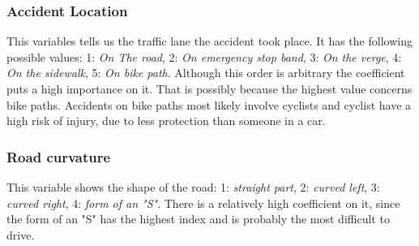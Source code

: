 \documentclass{article}
\begin{document}
\subsubsection{Accident Location}

This variables tells us the traffic lane the accident took place. It has the following possible values: 1: \textit{On The road}, 2: \textit{On emergency stop band}, 3: \textit{On the verge}, 4: \textit{On the sidewalk}, 5: \textit{On bike path}. Although this order is arbitrary the coefficient puts a high importance on it. That is possibly because the highest value concerns bike paths. Accidents on bike paths most likely involve cyclists and cyclist have a high risk of injury, due to less protection than someone in a car.





\subsubsection{Road curvature}

This variable shows the shape of the road: 1: \textit{straight part}, 2: \textit{curved left}, 3: \textit{curved right}, 4: \textit{form of an "S"}. There is a relatively high coefficient on it, since the form of an "S" has the highest index and is probably the most difficult to drive.
\end{document}
